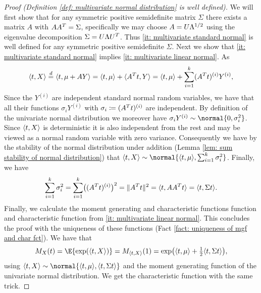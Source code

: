 \begin{proof}[Proof (Definition \ref{def: multivariate normal distribution} is well defined)]
    We will first show that for any symmetric positive semidefinite matrix \(\Sigma\)
    there exists a matrix \(A\) with \(A A^T = \Sigma\),
    specifically we may choose \(A = U \Lambda^{1/2}\) using the
    eigenvalue decomposition \(\Sigma = U \Lambda U^T\).
    Thus \ref{it: multivariate standard normal} is well defined for
    any symmetric positive semidefinite \(\Sigma\).
    Next we show that \ref{it: multivariate standard normal} implies 
    \ref{it: multivariate linear normal}. As
    \[
        \langle t, X\rangle
        \overset{d}= \langle t, \mu + A Y\rangle
        = \langle t, \mu\rangle + \langle A^T t, Y\rangle
        = \langle t, \mu\rangle + \sum_{i=1}^k (A^T t)^{(i)} Y^{(i)},
    \]
    Since the \(Y^{(i)}\) are independent standard normal random variables, we have that
    all their functions \(\sigma_i Y^{(i)}\) with \(\sigma_i \coloneq (A^T t)^{(i)}\)
    are independent. By definition of the univariate normal distribution
    we moreover have \(\sigma_i Y^{(i)} \sim \normal{0, \sigma_i^2}\). Since
    \(\langle t, X\rangle\) is deterministic it is also independent from the rest and
    may be viewed as a normal random variable with zero variance. Consequently
    we have by the stability of the normal distribution under addition (Lemma \ref{lem: sum stability of normal distribution})
    that \(\scp{t, X} \sim \normal{\scp{t, \mu}, \sum_{i=1}^k \sigma_i^2}\).
    Finally, we have
    \[
        \sum_{i=1}^k \sigma_i^2
        = \sum_{i=1}^k \bigl((A^T t)^{(i)}\bigr)^2
        = \|A^T t\|^2
        = \langle t, A A^T t\rangle
        = \langle t, \Sigma t\rangle.
    \]
    Finally, we calculate the moment generating and characteristic functions
    function and characteristic function from \ref{it: multivariate linear
    normal}. This concludes the proof with the uniqueness of these functions
    (Fact \ref{fact: uniqueness of mgf and char fct}). We have that
    \[
        \MGF_X(t) = \E{\exp(\scp{t, X})}
        = \MGF_{\scp{t, X}}(1)
        = \exp\bigl(\scp{t, \mu} + \tfrac12 \scp{t, \Sigma t}\bigr),
    \]
    using \(\scp{t, X} \sim \normal{\scp{t, \mu}, \scp{t, \Sigma t}}\)
    and the moment generating function of the univariate normal distribution.
    We get the characteristic function with the same trick.
\end{proof}

